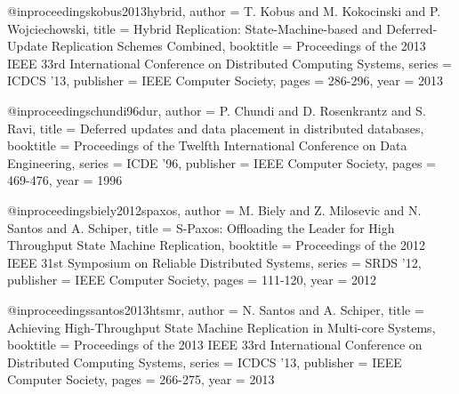 @inproceedings{kobus2013hybrid,
   author    = {T. Kobus and M. Kokocinski and P. Wojciechowski},
   title     = {Hybrid Replication: State-Machine-based and Deferred-Update Replication Schemes Combined},
   booktitle = {Proceedings of the 2013 IEEE 33rd International Conference on Distributed Computing Systems},
   series    = {ICDCS '13},
   publisher = {{IEEE} Computer Society},
   pages     = {286-296},
   year      = {2013}
}

@inproceedings{chundi96dur,
   author    = {P. Chundi and D. Rosenkrantz and S. Ravi},
   title     = {Deferred updates and data placement in distributed databases},
   booktitle = {Proceedings of the Twelfth International Conference on Data Engineering},
   series    = {ICDE '96},
   publisher = {{IEEE} Computer Society},
   pages     = {469-476},
   year      = {1996}
}

@inproceedings{biely2012spaxos,
   author    = {M. Biely and Z. Milosevic and N. Santos and A. Schiper},
   title     = {{S-Paxos}: Offloading the Leader for High Throughput State Machine Replication},
   booktitle = {Proceedings of the 2012 IEEE 31st Symposium on Reliable Distributed Systems},
   series    = {SRDS '12},
   publisher = {{IEEE} Computer Society},
   pages     = {111-120},
   year      = {2012}
}

@inproceedings{santos2013htsmr,
   author    = {N. Santos and A. Schiper},
   title     = {Achieving High-Throughput State Machine Replication in Multi-core Systems},
   booktitle = {Proceedings of the 2013 IEEE 33rd International Conference on Distributed Computing Systems},
   series    = {ICDCS '13},
   publisher = {{IEEE} Computer Society},
   pages     = {266-275},
   year      = {2013}
}

